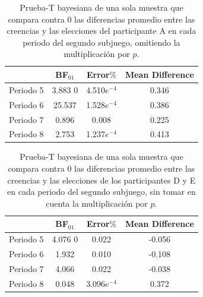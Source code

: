 \begin{table}
\caption[Diferencias Relativas en el Subjuego 2, omitiendo la multiplicación $\cdot p$ (Participantes A)]{Prueba-T bayesiana de una sola muestra que compara contra 0 las diferencias promedio entre las creencias y las elecciones del participante A en cada periodo del segundo subjuego, omitiendo la multiplicación por $p$.}
\label{DR_Sub2_A_NoP}
\centering
\begin{tabular}{l | c c c}  %
\toprule
\textbf{} & \textbf{BF$_{01}$} & \textbf{Error$\%$} & \textbf{Mean Difference}\\
\midrule
Periodo 5 & 3.883 0& 4.510$e^{-4}$ & 0.346 \\
Periodo 6 & 25.537 & 1.528$e^{-4}$ & 0.386 \\
Periodo 7 & 0.896 & 0.008 & 0.225 \\
Periodo 8 & 2.753 & 1.237$e^{-4}$ & 0.413 \\
\bottomrule
\end{tabular}
\end{table}

\begin{table}
\caption[Diferencias Relativas en el Subjuego 2, omitiendo la multiplicación $\cdot p$ (Participantes D y E)]{Prueba-T bayesiana de una sola muestra que compara contra 0 las diferencias promedio entre las creencias y las elecciones de los participantes D y E en cada periodo del segundo subjuego, sin tomar en cuenta la multiplicación por $p$.}
\label{DR_Sub2_DE_NoP}
\centering
\begin{tabular}{l | c c c}  %
\toprule
\textbf{} & \textbf{BF$_{01}$} & \textbf{Error$\%$} & \textbf{Mean Difference}\\
\midrule
Periodo 5 & 4.076 0& 0.022 & -0.056 \\
Periodo 6 & 1.932 & 0.010 & -0.108 \\
Periodo 7 & 4.066 & 0.022 & -0.038 \\
Periodo 8 & 0.048 & 3.096$e^{-4}$ & 0.372 \\
\bottomrule
\end{tabular}
\end{table}

